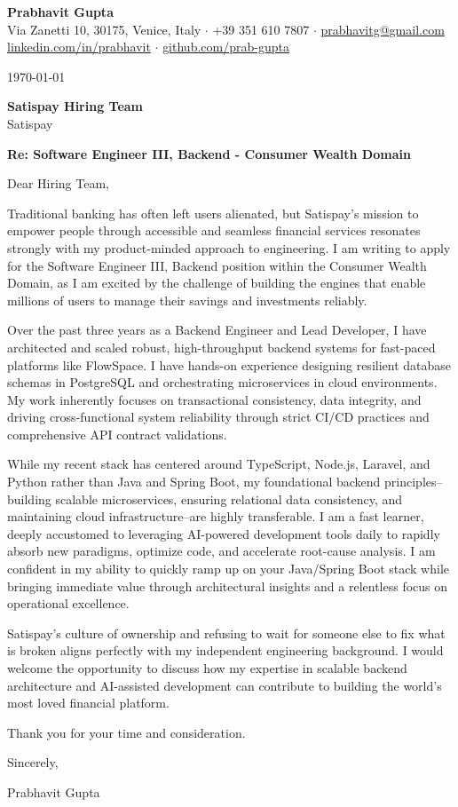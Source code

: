 \documentclass[11pt,a4paper]{article}
\begin{document}
\begin{center}
    {\Huge \textbf{Prabhavit Gupta}} \\
    \vspace{2mm}
    Via Zanetti 10, 30175, Venice, Italy $\cdot$ +39 351 610 7807 $\cdot$ \href{mailto:prabhavitg@gmail.com}{prabhavitg@gmail.com} \\
    \href{https://www.linkedin.com/in/prabhavit/}{linkedin.com/in/prabhavit} $\cdot$ \href{https://github.com/prab-gupta}{github.com/prab-gupta}
\end{center}

\vspace{5mm}

\today

\textbf{Satispay Hiring Team}\\
Satispay

\vspace{2mm}
\textbf{Re: Software Engineer III, Backend - Consumer Wealth Domain}

Dear Hiring Team,

Traditional banking has often left users alienated, but Satispay's mission to empower people through accessible and seamless financial services resonates strongly with my product-minded approach to engineering. I am writing to apply for the Software Engineer III, Backend position within the Consumer Wealth Domain, as I am excited by the challenge of building the engines that enable millions of users to manage their savings and investments reliably.

Over the past three years as a Backend Engineer and Lead Developer, I have architected and scaled robust, high-throughput backend systems for fast-paced platforms like FlowSpace. I have hands-on experience designing resilient database schemas in PostgreSQL and orchestrating microservices in cloud environments. My work inherently focuses on transactional consistency, data integrity, and driving cross-functional system reliability through strict CI/CD practices and comprehensive API contract validations. 

While my recent stack has centered around TypeScript, Node.js, Laravel, and Python rather than Java and Spring Boot, my foundational backend principles--building scalable microservices, ensuring relational data consistency, and maintaining cloud infrastructure--are highly transferable. I am a fast learner, deeply accustomed to leveraging AI-powered development tools daily to rapidly absorb new paradigms, optimize code, and accelerate root-cause analysis. I am confident in my ability to quickly ramp up on your Java/Spring Boot stack while bringing immediate value through architectural insights and a relentless focus on operational excellence.

Satispay's culture of ownership and refusing to wait for someone else to fix what is broken aligns perfectly with my independent engineering background. I would welcome the opportunity to discuss how my expertise in scalable backend architecture and AI-assisted development can contribute to building the world's most loved financial platform.

Thank you for your time and consideration.

Sincerely,

Prabhavit Gupta
\end{document}
